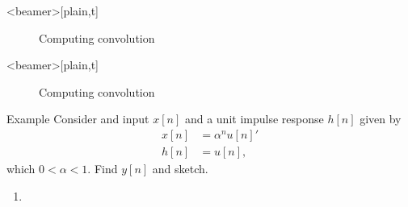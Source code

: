 \begin{frame}<beamer>[plain,t]
    \begin{figure}
      \centering
      
      \caption{Computing convolution}\label{fi:example01_discrete_conv_02}
    \end{figure}
\end{frame}



\begin{frame}<beamer>[plain,t]
    \begin{figure}
      \centering
      
      \caption{Computing convolution}\label{fi:example01_discrete_conv_03}
    \end{figure}
\end{frame}




\begin{frame}{Example}
    Consider and input $x[n]$ and a unit impulse response $h[n]$ given by 
    \begin{equation}
        \begin{split}
            x[n] &= \alpha^nu[n]'\\
            h[n] &= u[n],
        \end{split}
    \end{equation}
    which $0 < \alpha < 1$. Find $y[n]$ and sketch.
\end{frame}

\begin{frame}
    \begin{enumerate}
        \item
    \end{enumerate}
\end{frame}



